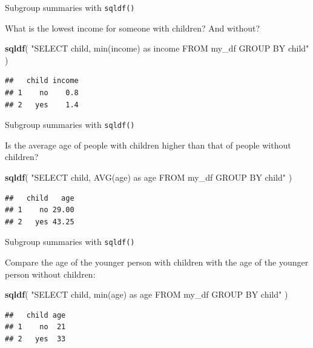 \documentclass[ignorenonframetext,]{beamer}
\newenvironment{Shaded}{\begin{snugshade}}{\end{snugshade}}
\newcommand{\KeywordTok}[1]{\textcolor[rgb]{0.13,0.29,0.53}{\textbf{#1}}}
\newcommand{\NormalTok}[1]{#1}
\newcommand{\StringTok}[1]{\textcolor[rgb]{0.31,0.60,0.02}{#1}}
\begin{document}
\begin{frame}[fragile]{Subgroup summaries with \texttt{sqldf()}}
\protect\hypertarget{subgroup-summaries-with-sqldf-2}{}

What is the lowest income for someone with children? And without?

\begin{Shaded}
\begin{Highlighting}[]
\KeywordTok{sqldf}\NormalTok{(}
  \StringTok{"SELECT child, min(income) as income }
\StringTok{  FROM my_df}
\StringTok{  GROUP BY child"}
\NormalTok{)}
\end{Highlighting}
\end{Shaded}

\begin{verbatim}
##   child income
## 1    no    0.8
## 2   yes    1.4
\end{verbatim}

\end{frame}

\begin{frame}[fragile]{Subgroup summaries with \texttt{sqldf()}}
\protect\hypertarget{subgroup-summaries-with-sqldf-3}{}

Is the average age of people with children higher than that of people
without children?

\begin{Shaded}
\begin{Highlighting}[]
\KeywordTok{sqldf}\NormalTok{(}
  \StringTok{"SELECT child, AVG(age) as age }
\StringTok{  FROM my_df}
\StringTok{  GROUP BY child"}
\NormalTok{)}
\end{Highlighting}
\end{Shaded}

\begin{verbatim}
##   child   age
## 1    no 29.00
## 2   yes 43.25
\end{verbatim}

\end{frame}

\begin{frame}[fragile]{Subgroup summaries with \texttt{sqldf()}}
\protect\hypertarget{subgroup-summaries-with-sqldf-4}{}

Compare the age of the younger person with children with the age of the
younger person without children:

\begin{Shaded}
\begin{Highlighting}[]
\KeywordTok{sqldf}\NormalTok{(}
  \StringTok{"SELECT child, min(age) as age }
\StringTok{  FROM my_df}
\StringTok{  GROUP BY child"}
\NormalTok{)}
\end{Highlighting}
\end{Shaded}

\begin{verbatim}
##   child age
## 1    no  21
## 2   yes  33
\end{verbatim}

\end{frame}
\end{document}
